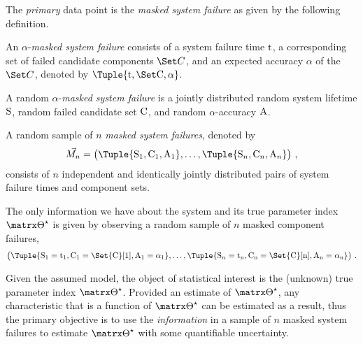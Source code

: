 \documentclass[../main.tex]{subfiles}
\begin{document}
The \emph{primary} data point is the \emph{masked system failure} as given by the following definition.
\begin{definition}
An $\alpha$-\emph{masked system failure} consists of a system failure time $\rm{t}$, a corresponding set of failed candidate components $\cand$, and an expected accuracy $\alpha$ of the $\cand$, denoted by $\Tuple{\ti,\cand,\alpha}$.
\end{definition}
\begin{assumption}
\label{asm:cand_prob}
A random $\alpha$-\emph{masked system failure} is a jointly distributed random system lifetime $\mathrm{S}$, random failed candidate set $\mathrm{C}$, and random $\alpha$-accuracy $\mathrm{A}$.
\end{assumption}

\begin{assumption}
\label{def:msfs}
A random sample of $n$ \emph{masked system failures}, denoted by
\begin{equation}
\mfs = \left( \Tuple{\sv_1,\rvcand_1,\RV{A}_1},\ldots,\Tuple{\sv_n,\rvcand_n,\RV{A}_n}\right)\,,
\end{equation}
consists of $n$ independent and identically jointly distributed pairs of system failure times and component sets.
\end{assumption}

\begin{assumption}
The only information we have about the system and its true parameter index $\tparam\sysparam$ is given by observing a random sample of $n$ masked component failures,
\begin{equation}
    \left(
    	\Tuple{\sv_1=\ti_1,\rvcand_1=\Set{C}[1], \RV{A}_1=\alpha_1}, \ldots, 
    	\Tuple{\sv_n=\ti_n,\rvcand_n=\Set{C}[n], \RV{A}_n=\alpha_n}
    \right)\,.
\end{equation}
\end{assumption}

Given the assumed model, the object of statistical interest is the (unknown) true parameter index $\tparam\sysparam$.
Provided an estimate of $\tparam\sysparam$, any characteristic that is a function of $\tparam\sysparam$ can be estimated as a result, thus the primary objective is to use the \emph{information} in a sample of $n$ masked system failures to estimate $\tparam\sysparam$ with some quantifiable uncertainty.
\end{document}
